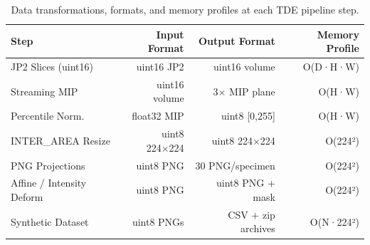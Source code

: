 \begin{table}[htbp]
\caption{Data transformations, formats, and memory profiles at each TDE pipeline step.}
\label{tab:data_flow}
\begin{tabular}{lrrr}
\toprule
Step & Input Format & Output Format & Memory Profile \\
\midrule
JP2 Slices (uint16) & uint16 JP2 & uint16 volume & O(D·H·W) \\
Streaming MIP & uint16 volume & 3× MIP plane & O(H·W) \\
Percentile Norm. & float32 MIP & uint8 [0,255] & O(H·W) \\
INTER\_AREA Resize & uint8 224×224 & uint8 224×224 & O(224²) \\
PNG Projections & uint8 PNG & 30 PNG/specimen & O(224²) \\
Affine / Intensity Deform & uint8 PNG & uint8 PNG + mask & O(224²) \\
Synthetic Dataset & uint8 PNGs & CSV + zip archives & O(N·224²) \\
\bottomrule
\end{tabular}
\end{table}
